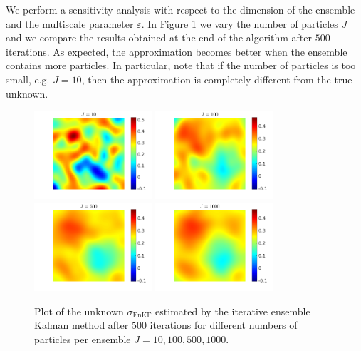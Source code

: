 \documentclass[10pt]{article}
\begin{document}
We perform a sensitivity analysis with respect to the dimension of the ensemble and the multiscale parameter $\varepsilon$. In Figure \ref{fig:comparison_J} we vary the number of particles $J$ and we compare the results obtained at the end of the algorithm after $500$ iterations. As expected, the approximation becomes better when the ensemble contains more particles. In particular, note that if the number of particles is too small, e.g. $J = 10$, then the approximation is completely different from the true unknown.

\begin{figure}[t]
\centering
\includegraphics[width = 0.39\textwidth]{ensemble_500_J10}
\includegraphics[width = 0.39\textwidth]{ensemble_500_J100}
\\
\includegraphics[width = 0.39\textwidth]{ensemble_500_J500}
\includegraphics[width = 0.39\textwidth]{ensemble_500_J1000}
\caption{Plot of the unknown $\sigma_{\mathrm{EnKF}}$ estimated by the iterative ensemble Kalman method after $500$ iterations for different numbers of particles per ensemble $J = 10, 100, 500, 1000$.}
\label{fig:comparison_J}
\end{figure}
\end{document}
